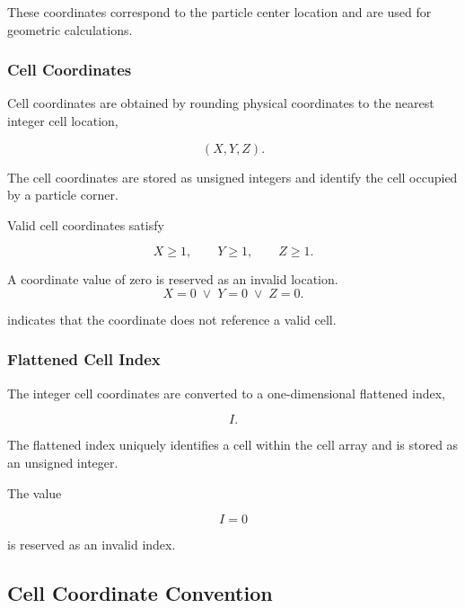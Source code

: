 These coordinates correspond to the particle center location and are
used for geometric calculations.

\subsubsection{Cell Coordinates}

Cell coordinates are obtained by rounding physical coordinates to the
nearest integer cell location,

\begin{equation}
(X,Y,Z).
\end{equation}

The cell coordinates are stored as unsigned integers and identify the
cell occupied by a particle corner.

Valid cell coordinates satisfy

\begin{equation}
X \geq 1,
\qquad
Y \geq 1,
\qquad
Z \geq 1.
\end{equation}

A coordinate value of zero is reserved as an invalid location.
\begin{equation}
X = 0 \;\lor\; Y = 0 \;\lor\; Z = 0.
\end{equation}

indicates that the coordinate does not reference a valid cell.

\subsubsection{Flattened Cell Index}

The integer cell coordinates are converted to a one-dimensional
flattened index,

\begin{equation}
I.
\end{equation}

The flattened index uniquely identifies a cell within the cell array
and is stored as an unsigned integer.

The value

\begin{equation}
I = 0
\end{equation}

is reserved as an invalid index.

\subsection{Cell Coordinate Convention}


